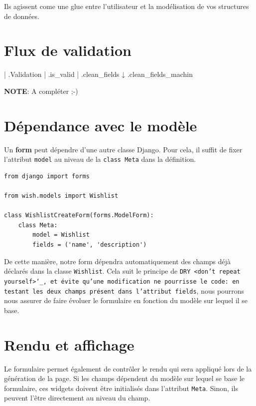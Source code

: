 \documentclass[11pt]{amsbook}
\newcommand{\admonition}[2]{\textbf{#1}: {#2}}
\begin{document}
Ils agissent come une glue entre l’utilisateur et la modélisation de vos structures de données.


\hypertarget{x-flux-de-validation}{\section{Flux de validation}}
| .Validation
| .is\_valid
| .clean\_fields
↓ .clean\_fields\_machin


\admonition{NOTE}{A compléter ;-)}
\hypertarget{x-dépendance-avec-le-modèle}{\section{Dépendance avec le modèle}}
Un \textbf{form} peut dépendre d’une autre classe Django. Pour cela, il suffit de fixer l’attribut \texttt{model} au niveau de la \texttt{class Meta} dans la définition.


\begin{verbatim}
from django import forms

from wish.models import Wishlist

class WishlistCreateForm(forms.ModelForm):
    class Meta:
        model = Wishlist
        fields = ('name', 'description')
\end{verbatim}

De cette manière, notre form dépendra automatiquement des champs déjà déclarés dans la classe \texttt{Wishlist}. Cela suit le principe de \texttt{DRY <don’t repeat yourself>`\_, et évite qu’une modification ne pourrisse le code: en testant les deux champs présent dans l’attribut fields}, nous pourrons nous assurer de faire évoluer le formulaire en fonction du modèle sur lequel il se base.


\hypertarget{x-rendu-et-affichage}{\section{Rendu et affichage}}
Le formulaire permet également de contrôler le rendu qui sera appliqué lors de la génération de la page. Si les champs dépendent du modèle sur lequel se base le formulaire, ces widgets doivent être initialisés dans l’attribut \texttt{Meta}. Sinon, ils peuvent l’être directement au niveau du champ.
\end{document}
